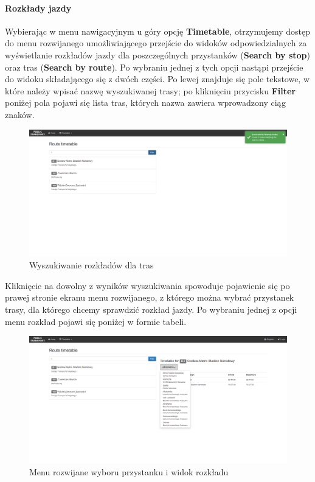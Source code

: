 \documentclass[10pt,a4paper]{article}
\begin{document}
\paragraph{Rozkłady jazdy}
Wybierając w menu nawigacyjnym u góry opcję \textbf{Timetable}, otrzymujemy dostęp do menu rozwijanego umożliwiającego przejście do widoków odpowiedzialnych za wyświetlanie rozkładów jazdy dla poszczególnych przystanków (\textbf{Search by stop}) oraz tras (\textbf{Search by route}). Po wybraniu jednej z tych opcji nastąpi przejście do widoku składającego się z dwóch części. Po lewej znajduje się pole tekstowe, w które należy wpisać nazwę wyszukiwanej trasy; po kliknięciu przycisku \textbf{Filter} poniżej pola pojawi się lista tras, których nazwa zawiera wprowadzony ciąg znaków.
\begin{figure}[H]
	\centering
	\includegraphics[width=15cm]{Resources/Images/28_stops_timetable.png}
	\caption{Wyszukiwanie rozkładów dla tras}
\end{figure}
Kliknięcie na dowolny z wyników wyszukiwania spowoduje pojawienie się po prawej stronie ekranu menu rozwijanego, z którego można wybrać przystanek trasy, dla którego chcemy sprawdzić rozkład jazdy. Po wybraniu jednej z opcji menu rozkład pojawi się poniżej w formie tabeli.
\begin{figure}[H]
	\centering
	\includegraphics[width=15cm]{Resources/Images/29_select_stop.png}
	\caption{Menu rozwijane wyboru przystanku i widok rozkładu}
\end{figure}
\end{document}
